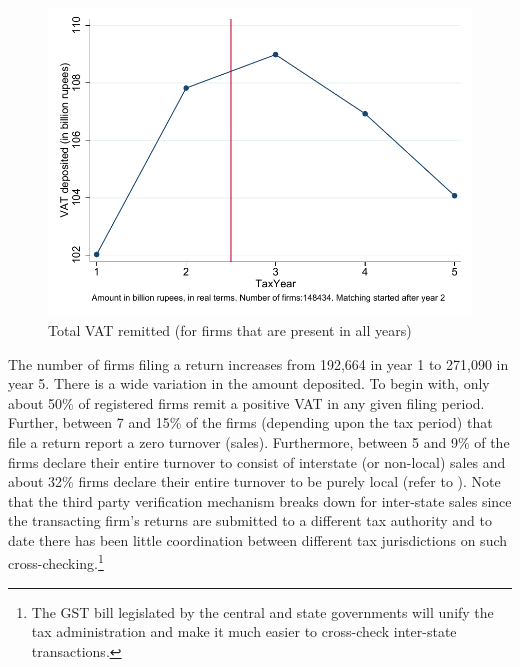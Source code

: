 
\begin{figure}[h] 
\centering
\includegraphics[width=.7\textwidth]{graphs/TotalVATDeposited_TotalCount5_Real.pdf}
\caption{Total VAT remitted (for firms that are present in all years)}
\label{fig:vatdeposited-alwayspresent}
\end{figure}

The number of firms filing a return increases from 192,664 in year 1 to 271,090 in year 5. There is a wide variation in the amount deposited. To begin with, only about 50\% of registered firms remit a positive VAT in any given filing period. Further, between 7 and 15\% of the firms (depending upon the tax period) that file a return report a zero turnover (sales). Furthermore, between 5 and 9\% of the firms declare their entire turnover to consist of interstate (or non-local) sales and about 32\% firms declare their entire turnover to be purely local
(refer to ). Note that the third party verification mechanism breaks down for inter-state sales since the transacting firm's returns are submitted to a different tax authority and to date there has been little coordination between different tax jurisdictions on such cross-checking.\footnote{The GST bill legislated
by the central and state governments will unify the tax administration and make it much easier to cross-check inter-state transactions.} 

